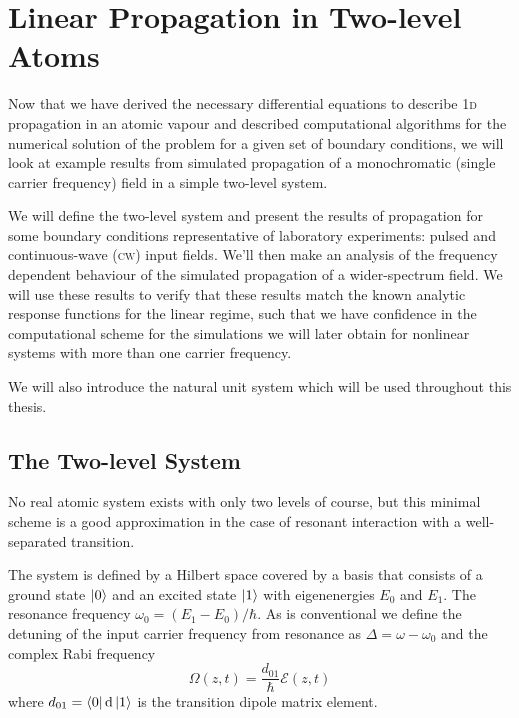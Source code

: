 \section{Linear Propagation in Two-level Atoms}
  \label{sec:propagation_twolevel}


    Now that we have derived the necessary differential equations to describe
    \textsc{1d} propagation in an atomic vapour and described computational
    algorithms for the numerical solution of the problem for a given set of
    boundary conditions, we will look at example results from simulated
    propagation of a monochromatic (\ie single carrier frequency) field in a
    simple two-level system.

    We will define the two-level system and present the results of propagation
    for some boundary conditions representative of laboratory experiments:
    pulsed and continuous-wave (\textsc{cw}) input fields. We'll then make an
    analysis of the frequency dependent behaviour of the simulated propagation
    of a wider-spectrum field. We will use these results to verify that these
    results match the known analytic response functions for the linear regime,
    such that we have confidence in the computational scheme for the
    simulations we will later obtain for nonlinear systems with more than one
    carrier frequency.

    We will also introduce the natural unit system which will be used throughout
    this thesis.

  \subsection{The Two-level System}

    No real atomic system exists with only two levels of course, but this
    minimal scheme is a good approximation in the case of resonant interaction
    with a well-separated transition.

    The system is defined by a Hilbert space covered by a basis that consists of
    a   ground state $\Ket{0}$ and an excited state $\Ket{1}$ with eigenenergies
    $E_0$ and $E_1$. The resonance frequency $\omega_0 = (E_1 - E_0)/\hbar$. As
    is conventional we define the detuning of the input carrier frequency from
    resonance as $\Delta = \omega - \omega_0$ and the complex Rabi
    frequency\cite{loudon2000quantum}
    \begin{equation}
      \Omega(z,t) =
      \frac{d_{01}}{\hbar} \mathcal{E}(z,t)
    \end{equation}
    where $d_{01} = \Bra{0} \mathrm{d} \Ket{1}$ is the transition dipole matrix element.

